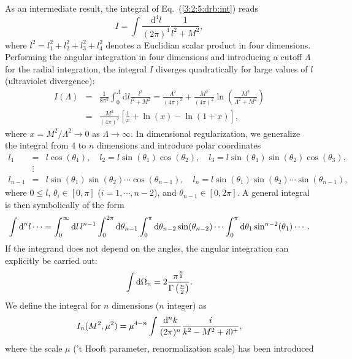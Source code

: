 \documentclass[twoside,12pt]{article}
\begin{document}
   As an intermediate result, the integral of
Eq.\ (\ref{3:2:5:drb:int}) reads
$$I=\int \frac{\mbox{d}^4 l}{(2\pi)^4} \frac{1}{l^2+M^2},
$$
   where $l^2=l_1^2+l_2^2+l_3^2+l_4^2$ denotes a Euclidian scalar
product in four dimensions.
   Performing the angular integration in four dimensions and introducing a cutoff
$\Lambda$ for the radial integration, the integral $I$ diverges quadratically for
large values of $l$ (ultraviolet divergence):
\begin{eqnarray}
\label{2:2:4:Icutoff}
I(\Lambda)&=&\frac{1}{8\pi^2}\int_0^\Lambda\mbox{d}l\frac{l^3}{l^2+M^2}
=\frac{\Lambda^2}{(4\pi)^2}+\frac{M^2}{(4\pi)^2}\ln\left(\frac{M^2}{\Lambda^2+M^2}\right)\nonumber\\
&=&\frac{M^2}{(4\pi)^2}\left[\frac{1}{x}+\ln(x)-\ln(1+x)\right],
\end{eqnarray}
where $x=M^2/\Lambda^2\to 0$ as $\Lambda\to\infty$.
     In dimensional regularization, we generalize the integral from 4 to $n$
dimensions and introduce polar coordinates
\begin{eqnarray*}
l_1&=& l\cos(\theta_1),\quad l_2= l\sin(\theta_1)\cos(\theta_2),\quad
l_3=l\sin(\theta_1)\sin(\theta_2)\cos(\theta_3),\nonumber\\
&\vdots&\nonumber\\
l_{n-1}&=&l\sin(\theta_1)\sin(\theta_2)\cdots\cos(\theta_{n-1}),\quad
l_{n}=l\sin(\theta_1)\sin(\theta_2)\cdots\sin(\theta_{n-1}),
\end{eqnarray*}
where $0\leq l$, $\theta_i\in[0,\pi]$ ($i=1,\cdots,n-2$), and $\theta_{n-1}\in [0,2\pi]$.
    A general integral is then symbolically of the form
\begin{eqnarray*}
\int {\rm d}^n l\cdots = \int_0^\infty {\rm d}l\,l^{n-1}
\int_0^{2\pi}{\rm d}\theta_{n-1} \int_0^\pi
{\rm d}\theta_{n-2}\sin(\theta_{n-2})\cdots\int_0^\pi {\rm d}\theta_1
\sin^{n-2}(\theta_1)\cdots.
\end{eqnarray*}
   If the integrand does not depend on the angles, the angular integration
can explicitly be carried out:
\begin{displaymath}
\int {\rm d}\Omega_n=
2\frac{\pi^{\frac{n}{2}}}{\Gamma\left(\frac{n}{2}\right)}.
\end{displaymath}
   We define the integral for $n$ dimensions ($n$ integer) as
\begin{displaymath}
I_n(M^2,\mu^2)=\mu^{4-n}\int\frac{{\rm d}^nk}{(2\pi)^n}\frac{i}{k^2-M^2+i0^+},
\end{displaymath}
where the scale $\mu$ ('t Hooft parameter, renormalization scale) has been introduced
\end{document}
